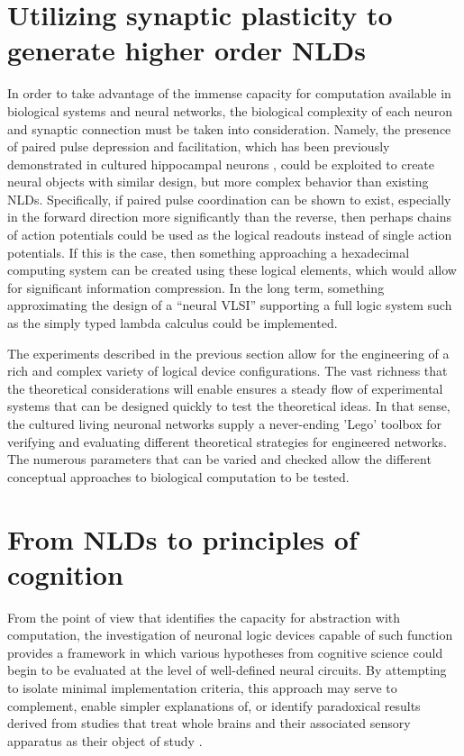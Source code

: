 \section{Utilizing synaptic plasticity to generate higher order NLDs}

 
In order to take advantage of the immense capacity for computation
available in biological systems and neural networks, the biological
complexity of each neuron and synaptic connection must be taken into
consideration. Namely, the presence of paired pulse depression and
facilitation, which has been previously demonstrated in cultured
hippocampal neurons \cite{Cummings1996}, could be exploited to create neural objects
with similar design, but more complex behavior than existing NLDs.
Specifically, if paired pulse coordination can be shown to exist,
especially in the forward direction more significantly than the reverse,
then perhaps chains of action potentials could be used as the logical
readouts instead of single action potentials. If this is the case, then
something approaching a hexadecimal computing system can be created
using these logical elements, which would allow for significant
information compression. In the long term, something approximating the
design of a ``neural VLSI'' supporting a full logic system such as the
simply typed lambda calculus could be implemented.

The experiments described in the previous section allow for the engineering of a rich and complex variety of logical device configurations. The vast richness that the theoretical considerations will enable ensures a steady flow of experimental systems that can be designed quickly to test the theoretical ideas. In that sense, the cultured living neuronal networks supply a never-ending 'Lego' toolbox for verifying and evaluating different theoretical strategies for engineered networks. The numerous parameters that can be varied and checked allow the different conceptual approaches to biological computation to be tested.  

\section{From NLDs to principles of cognition}

From the point of view that identifies the capacity for abstraction with
computation, the investigation of neuronal logic devices capable of such
function provides a framework in which various hypotheses from cognitive
science could begin to be evaluated at the level of well-defined neural
circuits. By attempting to isolate minimal implementation criteria, this
approach may serve to complement, enable simpler explanations of, or
identify paradoxical results derived from studies that treat whole
brains and their associated sensory apparatus as their object of study
\cite{McClelland2010,Griffiths2010}. 

